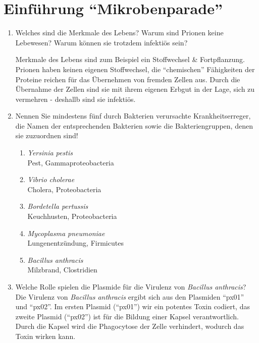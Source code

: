\section{Einführung ``Mikrobenparade''}
\begin{enumerate}
	\item Welches sind die Merkmale des Lebens? Warum sind Prionen keine Lebewesen? Warum können sie trotzdem infektiös sein? \hfill \vspace{4mm}

	Merkmale des Lebens sind zum Beispiel ein Stoffwechsel \& Fortpflanzung.
	Prionen haben keinen eigenen Stoffwechsel,
	die ``chemischen'' Fähigkeiten der Proteine reichen für das Übernehmen von fremden Zellen aus.
	Durch die Übernahme der Zellen sind sie mit ihrem eigenen Erbgut in der Lage,
	sich zu vermehren - deshallb sind sie infektiös.


	\item Nennen Sie mindestens fünf durch Bakterien verursachte Krankheitserreger, die Namen der entsprechenden Bakterien sowie die Bakteriengruppen, denen sie zuzuordnen sind!

	\begin{enumerate}[label=\arabic*)]
		\item \emph{Yersinia pestis} \hfill \\
			Pest, Gammaproteobacteria
		\item \emph{Vibrio cholerae} \hfill \\
			Cholera, Proteobacteria
		\item \emph{Bordetella pertussis} \hfill \\
			Keuchhusten, Proteobacteria
		\item \emph{Mycoplasma pneumoniae} \hfill \\
			Lungenentzündung, Firmicutes
		\item \emph{Bacillus anthracis} \hfill \\
			Milzbrand, Clostridien
	\end{enumerate}


	\item Welche Rolle spielen die Plasmide für die Virulenz von \emph{Bacillus anthracis}?  \hfill \vspace{0.2mm} \\

		Die Virulenz von \emph{Bacillus anthracis} ergibt sich
		aus den Plasmiden ``px01'' und ``px02''.
		Im ersten Plasmid (``px01'') wir ein potentes Toxin codiert,
		das zweite Plasmid (``px02'') ist für die Bildung einer Kapsel verantwortlich.
		Durch die Kapsel wird die Phagocytose der Zelle verhindert,
		wodurch das Toxin wirken kann.



\end{enumerate}
